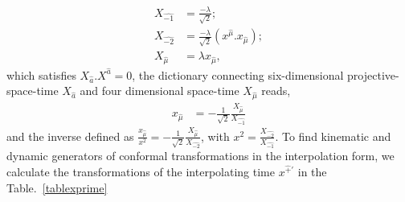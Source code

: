 \documentclass[%
 reprint,
superscriptaddress,
 amsmath,amssymb,
 aps,
]{revtex4-2}
\begin{document}
\begin{align}
    {X}_{\hat{-1}}&=\frac{-\lambda}{\sqrt{2}};\\
    {X}_{\hat{-2}}&=\frac{-\lambda}{\sqrt{2}}(x^{\hat{\mu}}.x_{\hat{\mu}});\\
     {X}_{\hat{\mu}}&=\lambda x_{\hat{\mu}},
\end{align}
which satisfies ${X}_{\hat{a}}.{X}^{\hat{a}}=0$, the dictionary connecting six-dimensional projective-space-time $X_{\hat{a}}$ and four dimensional space-time $X_{\hat{\mu}}$ reads,
\begin{align}
    x_{\hat{\mu}}&=-\frac{1}{\sqrt{2}}\frac{{X}_{\hat{\mu}}}{ {X}_{\hat{-1}}}
\end{align}
and the inverse defined as $\frac{x_{\hat{\mu}}}{x^2}=-\frac{1}{\sqrt{2}}\frac{{X}_{\hat{\mu}}}{{X}_{\hat{-2}}}$, with $x^2=\frac{{X}_{\hat{-2}}}{{X}_{\hat{-1}}}$. To find kinematic and dynamic generators of conformal transformations in the interpolation form, we calculate the transformations of the interpolating time $x^{\hat{+}\prime}$ in the Table.~\ref{tablexprime}
\begin{widetext}
\begin{center}
\begin{table}[h!]
        \centering
        \caption{Transformation of interpolating time under each conformal generator in $1+1$}
        \label{tablexprime}
    \end{table}
    \end{center}
\end{widetext}
\end{document}
